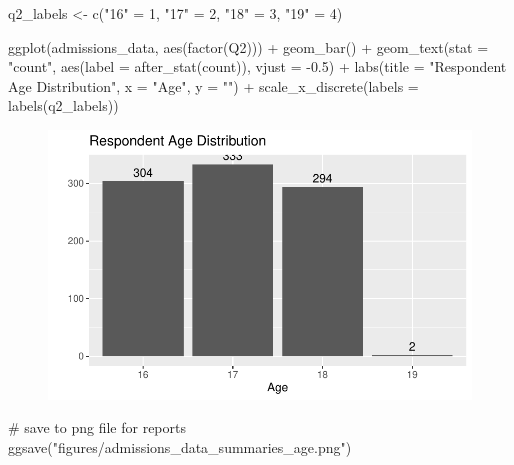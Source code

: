\documentclass[
  letterpaper,
  DIV=11,
  numbers=noendperiod]{scrartcl}
\newenvironment{Shaded}{\begin{snugshade}}{\end{snugshade}}
\newcommand{\AttributeTok}[1]{\textcolor[rgb]{0.40,0.45,0.13}{#1}}
\newcommand{\CommentTok}[1]{\textcolor[rgb]{0.37,0.37,0.37}{#1}}
\newcommand{\DecValTok}[1]{\textcolor[rgb]{0.68,0.00,0.00}{#1}}
\newcommand{\FloatTok}[1]{\textcolor[rgb]{0.68,0.00,0.00}{#1}}
\newcommand{\FunctionTok}[1]{\textcolor[rgb]{0.28,0.35,0.67}{#1}}
\newcommand{\NormalTok}[1]{\textcolor[rgb]{0.00,0.23,0.31}{#1}}
\newcommand{\OtherTok}[1]{\textcolor[rgb]{0.00,0.23,0.31}{#1}}
\newcommand{\SpecialCharTok}[1]{\textcolor[rgb]{0.37,0.37,0.37}{#1}}
\newcommand{\StringTok}[1]{\textcolor[rgb]{0.13,0.47,0.30}{#1}}
\begin{document}
\begin{Shaded}
\begin{Highlighting}[]
\NormalTok{q2\_labels }\OtherTok{\textless{}{-}} \FunctionTok{c}\NormalTok{(}\StringTok{"16"} \OtherTok{=} \DecValTok{1}\NormalTok{, }\StringTok{"17"} \OtherTok{=} \DecValTok{2}\NormalTok{, }\StringTok{"18"} \OtherTok{=} \DecValTok{3}\NormalTok{, }\StringTok{"19"} \OtherTok{=} \DecValTok{4}\NormalTok{)}

\FunctionTok{ggplot}\NormalTok{(admissions\_data, }\FunctionTok{aes}\NormalTok{(}\FunctionTok{factor}\NormalTok{(Q2))) }\SpecialCharTok{+} 
  \FunctionTok{geom\_bar}\NormalTok{() }\SpecialCharTok{+}
  \FunctionTok{geom\_text}\NormalTok{(}\AttributeTok{stat =} \StringTok{"count"}\NormalTok{, }\FunctionTok{aes}\NormalTok{(}\AttributeTok{label =} \FunctionTok{after\_stat}\NormalTok{(count)), }\AttributeTok{vjust =} \SpecialCharTok{{-}}\FloatTok{0.5}\NormalTok{) }\SpecialCharTok{+}
  \FunctionTok{labs}\NormalTok{(}\AttributeTok{title =} \StringTok{"Respondent Age Distribution"}\NormalTok{, }\AttributeTok{x =} \StringTok{"Age"}\NormalTok{, }\AttributeTok{y =} \StringTok{""}\NormalTok{) }\SpecialCharTok{+}
  \FunctionTok{scale\_x\_discrete}\NormalTok{(}\AttributeTok{labels =} \FunctionTok{labels}\NormalTok{(q2\_labels))}
\end{Highlighting}
\end{Shaded}

\begin{figure}[H]

{\centering \includegraphics{final_draft_files/figure-pdf/age-1.pdf}

}

\end{figure}

\begin{Shaded}
\begin{Highlighting}[]
\CommentTok{\# save to png file for reports}
\FunctionTok{ggsave}\NormalTok{(}\StringTok{"figures/admissions\_data\_summaries\_age.png"}\NormalTok{)}
\end{Highlighting}
\end{Shaded}
\end{document}
